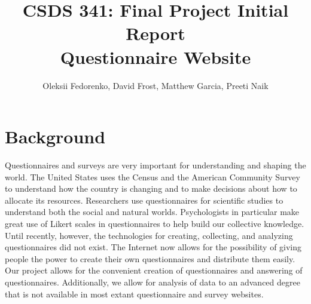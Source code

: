 \documentclass[12pt, oneside, a4paper]{article}
\title{CSDS 341: Final Project Initial Report\\ Questionnaire Website}
\author{Oleksii Fedorenko, David Frost, Matthew Garcia, Preeti Naik}
\begin{document}
    \maketitle
    \section{Background}
    Questionnaires and surveys are very important for understanding and shaping the world. The United States uses the Census and the
    American Community Survey to understand how the country is changing and to make decisions about how to allocate its
    resources. Researchers use questionnaires for scientific studies to understand both the social and natural worlds.
    Psychologists in particular make great use of Likert scales in questionnaires to help build our collective knowledge.
    Until recently, however, the technologies for creating, collecting, and analyzing questionnaires did not exist.
    The Internet now allows for the possibility of giving people the power to create their own questionnaires and distribute
    them easily. Our project allows for the convenient creation of questionnaires and answering of questionnaires. Additionally,
    we allow for analysis of data to an advanced degree that is not available in most extant questionnaire and survey websites.
\end{document}
